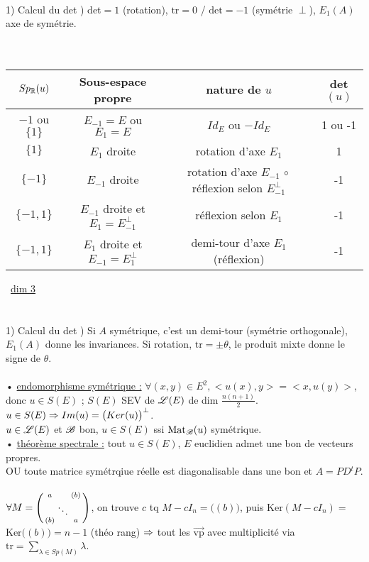 \documentclass[12 pt]{exampleclass}
\begin{document}
\text{}\\
1) Calcul du det ) det$=1$ (rotation), $\text{tr}=0$ / $\text{det}=-1$ (symétrie $\perp$), $E_1(A)$ axe de symétrie.\\
\text{}\\
\text{}\\
\begin{tabular}{|c|c|c|c|}
\hline
    $Sp_{\mathbb{R}}(u)$ & Sous-espace propre & nature de $u$ & det$(u)$ \\\hline
    ${-1}$ ou $\{1\}$ & $E_{-1}=E$ ou $E_1=E$ & $Id_E$ ou $-Id_E$ & 1 ou -1\\\hline
    $\{1\}$ & $E_1$ droite & rotation d'axe $E_1$ & 1\\\hline
    $\{-1\}$ & $E_{-1}$ droite & rotation d'axe $E_{-1}\, \circ$ réflexion selon $E_{-1}^\perp$ & -1\\\hline
    $\{-1,1\}$ & $E_{-1}$ droite et $E_1 = E_{-1}^\perp$ & réflexion selon $E_1$ & -1\\\hline
    $\{-1,1\}$ & $E_{1}$ droite et $E_{-1} = E_1^\perp$ & demi-tour d'axe $E_1$ (réflexion) & -1\\\hline
\end{tabular} \ \underline{dim 3}\\
\text{}\\
\text{}\\
1) Calcul du det ) Si $A$ symétrique, c'est un demi-tour (symétrie orthogonale), $E_1(A)$ donne les invariances. Si rotation, $\text{tr}=\pm\theta$, le produit mixte donne le signe de $\theta$.\\
\text{}\\
• \underline{endomorphisme symétrique :} $\forall (x,y)\in E^2,<u(x),y>=<x,u(y)>$, donc $u\in S(E)$ ; $S(E)$ SEV de $\mathscr{L}(E)$ de dim $\frac{n(n+1)}{2}$.\\
$u\in S(E) \Rightarrow Im(u) = \big(Ker(u)\big)^\perp$.\\
$u\in\mathscr{L}(E)$ et $\mathscr{B}$ bon, $u\in S(E)$ ssi $\text{Mat}_{\mathscr{B}}(u)$ symétrique.\\
• \underline{théorème spectrale :} tout $u\in S(E)$, $E$ euclidien admet une bon de vecteurs propres.\\
OU toute matrice symétrqiue réelle est diagonalisable dans une bon et $A=PD{}^tP$.\\
\text{}\\
$\forall M =\begin{psmallmatrix} a&&(b)\\ &\ddots&\\  (b)&&a\end{psmallmatrix}$, on trouve $c$ tq $M-cI_n = \big((b)\big)$, puis Ker$(M-cI_n) = $Ker$\big((b)\big) = n-1$ (théo rang) $\Rightarrow$ tout les $\Vec{\text{vp}}$ avec multiplicité via $\text{tr} = \sum_{\lambda\in Sp(M)} \lambda$.\\
\end{document}
